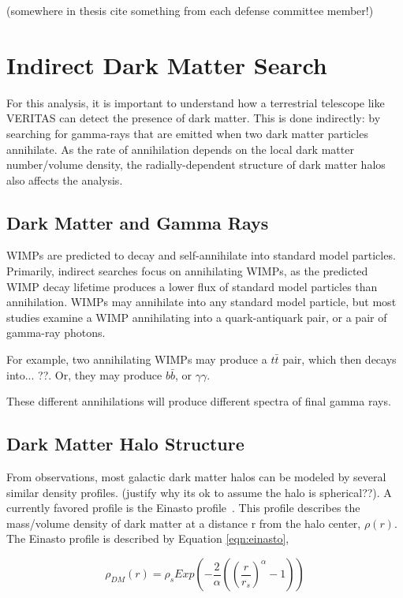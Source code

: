   {\color{red}(somewhere in thesis cite something from each defense committee member!)}

\section{Indirect Dark Matter Search}
  For this analysis, it is important to understand how a terrestrial telescope like VERITAS can detect the presence of dark matter.
  This is done indirectly: by searching for gamma-rays that are emitted when two dark matter particles annihilate.
  As the rate of annihilation depends on the local dark matter number/volume density, the radially-dependent structure of dark matter halos also affects the analysis.

  \subsection{Dark Matter and Gamma Rays}
    WIMPs are predicted to decay and self-annihilate into standard model particles.
    Primarily, indirect searches focus on annihilating WIMPs, as the predicted WIMP decay lifetime produces a lower flux of standard model particles than annihilation.
    WIMPs may annihilate into any standard model particle, but most studies examine a WIMP annihilating into a quark-antiquark pair, or a pair of gamma-ray photons.

    For example, two annihilating WIMPs may produce a $t\bar{t}$ pair, which then decays into... {\color{red}??}.
    Or, they may produce $b\bar{b}$, or $\gamma\gamma$.

    These different annihilations will produce different spectra of final gamma rays.
  
  \subsection{Dark Matter Halo Structure}\label{dm_spatial}
    From observations, most galactic dark matter halos can be modeled by several similar density profiles.
    {\color{red}(justify why its ok to assume the halo is spherical??).}
    A currently favored profile is the Einasto profile~\cite{einastoprofile1,einastoprofile2}.
    This profile describes the mass/volume density of dark matter at a distance r from the halo center, $\rho(r)$.
    The Einasto profile is described by Equation \ref{eqn:einasto},

    \begin{equation} \label{eqn:einasto}
      \rho_{DM} \left( r \right) = \rho_{s} Exp \left( - \frac{2}{\alpha} \left( {\left( \frac{r}{r_s} \right)}^{\alpha} - 1 \right) \right)
    \end{equation}
    

